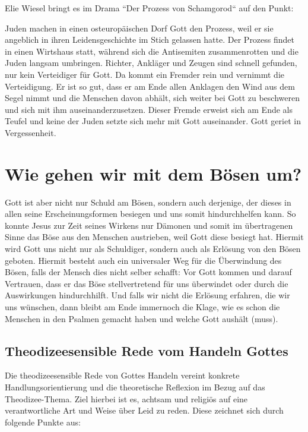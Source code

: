 Elie Wiesel bringt es im Drama ``Der Prozess von Schamgorod`` auf den Punkt:
\begin{displayquote}
Juden machen in einen osteuropäischen Dorf Gott den Prozess, weil er sie angeblich in ihren Leidensgeschichte im Stich gelassen hatte. Der Prozess findet in einen Wirtshaus statt, während sich die Antisemiten zusammenrotten und die Juden langsam umbringen. Richter, Ankläger und Zeugen sind schnell gefunden, nur kein Verteidiger für Gott. Da kommt ein Fremder rein und vernimmt die Verteidigung. Er ist so gut, dass er am Ende allen Anklagen den Wind aus dem Segel nimmt und die Menschen  davon abhält, sich weiter bei Gott zu beschweren und sich mit ihm auseinanderzusetzen. Dieser Fremde erweist sich am Ende als Teufel und keine der Juden setzte sich mehr mit Gott auseinander. Gott geriet in Vergessenheit.
\end{displayquote}

\section{Wie gehen wir mit dem Bösen um?}
Gott ist aber nicht nur Schuld am Bösen, sondern auch derjenige, der dieses in allen seine Erscheinungsformen besiegen
und uns somit hindurchhelfen kann. So konnte Jesus zur Zeit seines Wirkens nur Dämonen und somit im übertragenen Sinne
das Böse aus den Menschen austrieben, weil Gott diese besiegt hat. Hiermit wird Gott uns nicht nur als Schuldiger,
sondern auch als Erlösung von den Bösen geboten. Hiermit besteht auch ein universaler Weg für die Überwindung des
Bösen, falls der Mensch dies nicht selber schafft: Vor Gott kommen und darauf Vertrauen, dass er das Böse
stellvertretend für uns überwindet oder durch die Auswirkungen hindurchhilft. Und falls wir nicht die Erlösung
erfahren, die wir uns wünschen, dann bleibt am Ende immernoch die Klage, wie es schon die Menschen in den Psalmen
gemacht haben und welche Gott aushält (muss).


\subsection{Theodizeesensible Rede vom Handeln Gottes}
Die theodizeesensible Rede von Gottes Handeln vereint konkrete Handlungsorientierung und die theoretische Reflexion im Bezug auf das Theodizee-Thema. Ziel hierbei ist es, achtsam und religiös auf eine verantwortliche Art und Weise über Leid zu reden. Diese zeichnet sich durch folgende Punkte aus:

